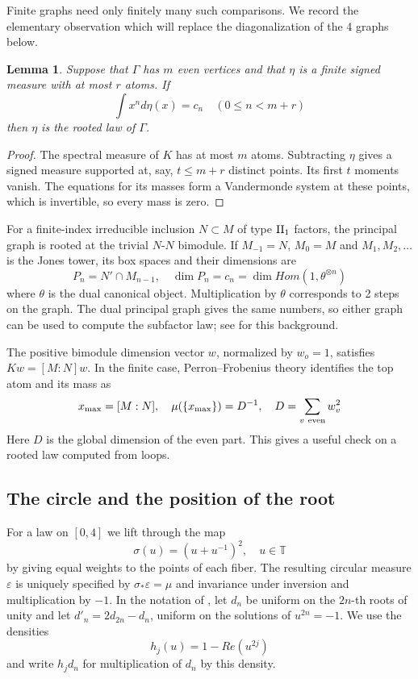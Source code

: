 \documentclass[11pt,reqno]{amsart}
\newtheorem{lemma}[thm]{Lemma}
\theoremstyle{definition}
\numberwithin{equation}{section}
\begin{document}
Finite graphs need only finitely many such comparisons. We record the elementary observation which will replace the diagonalization of the 4 graphs below.

\begin{lemma}\label{lem:finite-moments}
Suppose that $\Gamma$ has $m$ even vertices and that $\eta$ is a finite signed measure with at most $r$ atoms. If
$$\int x^nd\eta(x)=c_n\quad(0\leq n<m+r)$$
then $\eta$ is the rooted law of $\Gamma$.
\end{lemma}
\begin{proof}
The spectral measure of $K$ has at most $m$ atoms. Subtracting $\eta$ gives a signed measure supported at, say, $t\leq m+r$ distinct points. Its first $t$ moments vanish. The equations for its masses form a Vandermonde system at these points, which is invertible, so every mass is zero.
\end{proof}

For a finite-index irreducible inclusion $N\subset M$ of type ${\rm II}_1$ factors, the principal graph is rooted at the trivial $N$-$N$ bimodule. If $M_{-1}=N$, $M_0=M$ and $M_1,M_2,\ldots$ is the Jones tower, its box spaces and their dimensions are
$$P_n=N'\cap M_{n-1},\quad \dim P_n=c_n=\dim Hom(1,\theta^{\otimes n})$$
where $\theta$ is the dual canonical object. Multiplication by $\theta$ corresponds to 2 steps on the graph. The dual principal graph gives the same numbers, so either graph can be used to compute the subfactor law; see \cite{Jon83,Jon99,JS97,JMS14} for this background.

The positive bimodule dimension vector $w$, normalized by $w_o=1$, satisfies $Kw=[M:N]w$. In the finite case, Perron--Frobenius theory identifies the top atom and its mass as
$$x_{\max}=[M:N],\quad \mu(\{x_{\max}\})=D^{-1},\quad D=\sum_{v\ {\rm even}}w_v^2$$
Here $D$ is the global dimension of the even part. This gives a useful check on a rooted law computed from loops.

\subsection{The circle and the position of the root}\label{sec:circle}

For a law on $[0,4]$ we lift through the map
$$\sigma(u)=(u+u^{-1})^2,\quad u\in\mathbb T$$
by giving equal weights to the points of each fiber. The resulting circular measure $\varepsilon$ is uniquely specified by $\sigma_*\varepsilon=\mu$ and invariance under inversion and multiplication by $-1$. In the notation of \cite{BB07,Ban09}, let $d_n$ be uniform on the $2n$-th roots of unity and let $d'_n=2d_{2n}-d_n$, uniform on the solutions of $u^{2n}=-1$. We use the densities
$$h_j(u)=1-Re(u^{2j})$$
and write $h_jd_n$ for multiplication of $d_n$ by this density.
\end{document}
